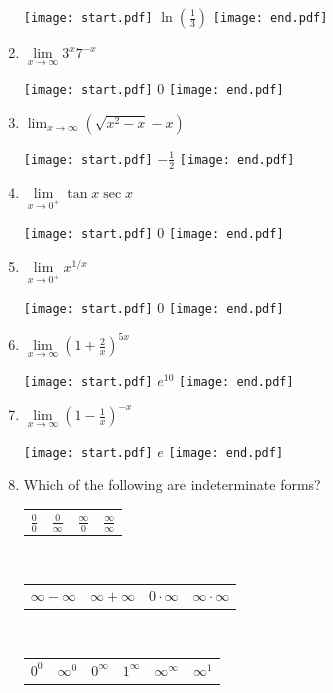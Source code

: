 \documentclass[12pt]{article}
\begin{document}
\begin{enumerate}
\texttt{[image: start.pdf]}
{{$\ln{\left(\frac{1}{3}\right)}$}}
\texttt{[image: end.pdf]}


\item $\lim\limits_{x\rightarrow \infty} 3^{x}7^{-x}$ 

\texttt{[image: start.pdf]}
{{0}}
\texttt{[image: end.pdf]}


\item  $\displaystyle \lim_{x\rightarrow \infty}{\left(\sqrt{x^2-x}-x\right)}$

\texttt{[image: start.pdf]}
{{$\displaystyle -\frac{1}{2}$}}
\texttt{[image: end.pdf]}


\item $\lim\limits_{x\rightarrow 0^+} \tan{x}\sec{x}$ 

\texttt{[image: start.pdf]}
{{0}}
\texttt{[image: end.pdf]}


\item $\lim\limits_{x\rightarrow 0^+} x^{1/x}$ 

\texttt{[image: start.pdf]}
{{0}}
\texttt{[image: end.pdf]}


\item $\lim\limits_{x\rightarrow \infty} \left(1+\frac{2}{x}\right)^{5x}$ 

\texttt{[image: start.pdf]}
{{$e^{10}$}}
\texttt{[image: end.pdf]}


\item $\lim\limits_{x\rightarrow \infty} \left(1-\frac{1}{x}\right)^{-x}$ 

\texttt{[image: start.pdf]}
{{$e$}}
\texttt{[image: end.pdf]}


\newpage

\item Which of the following are indeterminate forms?

\begin{center}
\begin{tabular}{cccc}
$\frac{0}{0}$ & $\frac{0}{\infty}$ & $\frac{\infty}{0}$& $\frac{\infty}{\infty}$
\end{tabular}\\
\medskip
\begin{tabular}{cccc}
$\infty-\infty$ & $\infty+\infty$ & $0 \cdot \infty$ & $\infty \cdot \infty$
\end{tabular}\\
\medskip
\begin{tabular}{cccccc}
$0^0$ & $\infty^0$ & $0^{\infty}$ & $1^\infty$ & $\infty^{\infty}$ & $\infty^{1}$
\end{tabular}
\end{center}


\end{enumerate}
\end{document}
